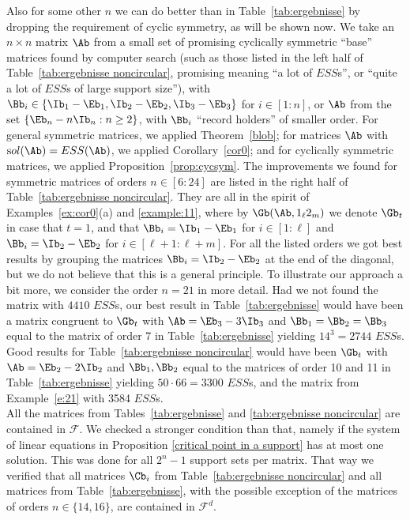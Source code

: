 \documentclass[moor]{informs3}              %
\def\irg#1#2{{ \in\! [{#1}\! : \! {#2}]}}
\def\coma#1{{#1}}
\begin{document}
Also for some other $n$ we can do better than in Table~\ref{tab:ergebnisse} by dropping the requirement of cyclic symmetry, as will be shown now. We take an $n\times n$ matrix $\Ab$ from a small set of promising cyclically symmetric ``base'' matrices found by computer search (such as those listed in
the left half of Table~\ref{tab:ergebnisse noncircular}, promising meaning ``a lot of $ESS$s'', or ``quite a lot of $ESS$s of large support size''),
with $\Bb_i\in\{\Ib_1-\Eb_1,\Ib_2-\Eb_2,\Ib_3-\Eb_3\}$ for $i\irg 1n$, or $\Ab$ from the set $\{\Eb_n-n\Ib_n:n\ge2\}$, with $\Bb_i$ ``record holders'' of smaller order. \coma{For general symmetric matrices, we applied Theorem~\ref{blob}; for matrices $\Ab$ with $\mathrm sol (\Ab) = ESS(\Ab)$, we applied Corollary~\ref{cor0}; and for cyclically symmetric matrices, we applied Proposition~\ref{prop:cycsym}.} The improvements we found for
symmetric matrices of orders $n\in[6:24]$ are listed in the right half of Table~\ref{tab:ergebnisse noncircular}.
They are all in the spirit of Examples~\ref{ex:cor0}(a) and \ref{example:11}, where by $\Gb(\Ab,1_\ell 2_m)$ we denote $\Gb_t$ in case that
$t=1$, and that $\Bb_i=\Ib_1-\Eb_1$ for $i\irg 1\ell$ and $\Bb_i=\Ib_2-\Eb_2$ for $i\in[\ell\!+\!1\!:\!\ell\!+\!m]$.
For all the listed orders we got best results by grouping the matrices $\Bb_i=\Ib_2-\Eb_2$ at the end of the diagonal, but we do not believe that this is a general principle.
To illustrate our approach a bit more, we consider the order $n=21$ in more detail. Had we not found the matrix with $4410$ $ESS$s, our best result in Table~\ref{tab:ergebnisse} would have been a matrix congruent to $\Gb_t$ with $\Ab=\Eb_3-3\Ib_3$ and $\Bb_1=\Bb_2=\Bb_3$ equal to the matrix of order 7 in Table~\ref{tab:ergebnisse} yielding $14^3=2744$ $ESS$s. Good results for Table~\ref{tab:ergebnisse noncircular} would have been $\Gb_t$ with $\Ab=\Eb_2-2\Ib_2$ and $\Bb_1,\Bb_2$ equal to the matrices of order 10 and 11 in Table~\ref{tab:ergebnisse} yielding $50\cdot66=3300$ $ESS$s, and the matrix from Example~\ref{e:21} with 3584 $ESS$s.\\
All the matrices from Tables~\ref{tab:ergebnisse} and \ref{tab:ergebnisse noncircular} are contained in $\mathcal{F}$. We checked a stronger condition than that, namely if
the system of linear equations in Proposition \ref{critical point in a support} has at most one solution. This was done for all $2^n-1$ support sets per matrix. That way we verified that all matrices $\Cb_i$ from Table~\ref{tab:ergebnisse noncircular} and all matrices from Table~\ref{tab:ergebnisse}, with the possible exception of the matrices of orders $n\in\{14,16\}$, are contained in $\mathcal{F}^d$.
\end{document}
